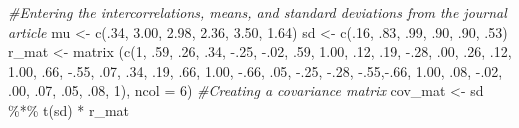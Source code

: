 \documentclass[
  11pt,
]{book}
\newenvironment{Shaded}{\begin{snugshade}}{\end{snugshade}}
\newcommand{\AttributeTok}[1]{\textcolor[rgb]{0.77,0.63,0.00}{#1}}
\newcommand{\CommentTok}[1]{\textcolor[rgb]{0.56,0.35,0.01}{\textit{#1}}}
\newcommand{\DecValTok}[1]{\textcolor[rgb]{0.00,0.00,0.81}{#1}}
\newcommand{\FloatTok}[1]{\textcolor[rgb]{0.00,0.00,0.81}{#1}}
\newcommand{\FunctionTok}[1]{\textcolor[rgb]{0.00,0.00,0.00}{#1}}
\newcommand{\NormalTok}[1]{#1}
\newcommand{\OtherTok}[1]{\textcolor[rgb]{0.56,0.35,0.01}{#1}}
\newcommand{\SpecialCharTok}[1]{\textcolor[rgb]{0.00,0.00,0.00}{#1}}
\begin{document}
\begin{Shaded}
\begin{Highlighting}[]
\CommentTok{\#Entering the intercorrelations, means, and standard deviations from the journal article}
\NormalTok{mu }\OtherTok{\textless{}{-}} \FunctionTok{c}\NormalTok{(.}\DecValTok{34}\NormalTok{, }\FloatTok{3.00}\NormalTok{, }\FloatTok{2.98}\NormalTok{, }\FloatTok{2.36}\NormalTok{, }\FloatTok{3.50}\NormalTok{, }\FloatTok{1.64}\NormalTok{)}
\NormalTok{sd }\OtherTok{\textless{}{-}} \FunctionTok{c}\NormalTok{(.}\DecValTok{16}\NormalTok{, .}\DecValTok{83}\NormalTok{, .}\DecValTok{99}\NormalTok{, .}\DecValTok{90}\NormalTok{, .}\DecValTok{90}\NormalTok{, .}\DecValTok{53}\NormalTok{)}
\NormalTok{r\_mat }\OtherTok{\textless{}{-}} \FunctionTok{matrix}\NormalTok{ (}\FunctionTok{c}\NormalTok{(}\DecValTok{1}\NormalTok{,   .}\DecValTok{59}\NormalTok{, .}\DecValTok{26}\NormalTok{,   .}\DecValTok{34}\NormalTok{,  }\SpecialCharTok{{-}}\NormalTok{.}\DecValTok{25}\NormalTok{, }\SpecialCharTok{{-}}\NormalTok{.}\DecValTok{02}\NormalTok{,}
\NormalTok{                  .}\DecValTok{59}\NormalTok{, }\FloatTok{1.00}\NormalTok{, .}\DecValTok{12}\NormalTok{,   .}\DecValTok{19}\NormalTok{,  }\SpecialCharTok{{-}}\NormalTok{.}\DecValTok{28}\NormalTok{, .}\DecValTok{00}\NormalTok{, }
\NormalTok{                  .}\DecValTok{26}\NormalTok{,  .}\DecValTok{12}\NormalTok{, }\FloatTok{1.00}\NormalTok{, .}\DecValTok{66}\NormalTok{,  }\SpecialCharTok{{-}}\NormalTok{.}\DecValTok{55}\NormalTok{, .}\DecValTok{07}\NormalTok{,}
\NormalTok{                  .}\DecValTok{34}\NormalTok{,  .}\DecValTok{19}\NormalTok{, .}\DecValTok{66}\NormalTok{,  }\FloatTok{1.00}\NormalTok{, }\SpecialCharTok{{-}}\NormalTok{.}\DecValTok{66}\NormalTok{, .}\DecValTok{05}\NormalTok{,}
                 \SpecialCharTok{{-}}\NormalTok{.}\DecValTok{25}\NormalTok{, }\SpecialCharTok{{-}}\NormalTok{.}\DecValTok{28}\NormalTok{, }\SpecialCharTok{{-}}\NormalTok{.}\DecValTok{55}\NormalTok{,}\SpecialCharTok{{-}}\NormalTok{.}\DecValTok{66}\NormalTok{,  }\FloatTok{1.00}\NormalTok{, .}\DecValTok{08}\NormalTok{, }
                 \SpecialCharTok{{-}}\NormalTok{.}\DecValTok{02}\NormalTok{,  .}\DecValTok{00}\NormalTok{,  .}\DecValTok{07}\NormalTok{, .}\DecValTok{05}\NormalTok{, .}\DecValTok{08}\NormalTok{,  }\DecValTok{1}\NormalTok{), }\AttributeTok{ncol =} \DecValTok{6}\NormalTok{)}
\CommentTok{\#Creating a covariance matrix}
\NormalTok{cov\_mat }\OtherTok{\textless{}{-}}\NormalTok{ sd }\SpecialCharTok{\%*\%} \FunctionTok{t}\NormalTok{(sd) }\SpecialCharTok{*}\NormalTok{ r\_mat}


\end{Highlighting}
\end{Shaded}
\end{document}
